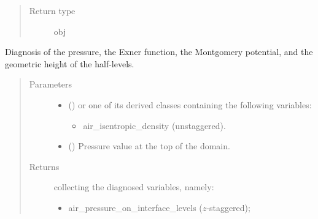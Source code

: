 \documentclass[letterpaper,10pt,english]{sphinxmanual}
\begin{document}
\begin{fulllineitems}
\begin{fulllineitems}
\begin{quote}
\begin{description}
\begin{itemize}
\end{itemize}


\item[{Return type}] \leavevmode
obj

\end{description}\end{quote}

\end{fulllineitems}


\begin{fulllineitems}
\label{\detokenize{api:tasmania.dycore.diagnostic_isentropic.DiagnosticIsentropic.get_diagnostic_variables}}
Diagnosis of the pressure, the Exner function, the Montgomery potential, and the geometric height of the half-levels.
\begin{quote}\begin{description}
\item[{Parameters}] \leavevmode\begin{itemize}
\item {} 
 () \textendash{} 
{\hyperref[\detokenize{api:tasmania.storages.grid_data.GridData}]{}} or one of its derived classes containing the following variables:
\begin{itemize}
\item {} 
air\_isentropic\_density (unstaggered).

\end{itemize}


\item {} 
 () \textendash{} Pressure value at the top of the domain.

\end{itemize}

\item[{Returns}] \leavevmode

{\hyperref[\detokenize{api:tasmania.storages.grid_data.GridData}]{}} collecting the diagnosed variables, namely:
\begin{itemize}
\item {} 
air\_pressure\_on\_interface\_levels (\(z\)-staggered);


\end{itemize}
\end{description}
\end{quote}
\end{fulllineitems}
\end{fulllineitems}
\end{document}
